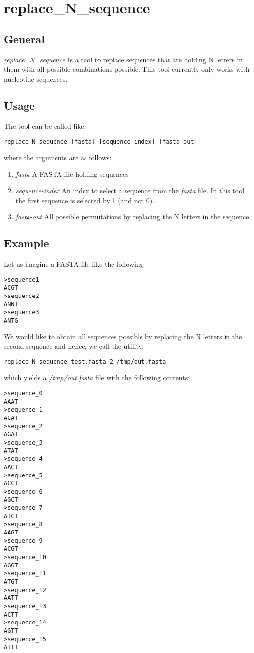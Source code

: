 \section{replace\_N\_sequence}


\subsection{General}

\emph{replace\_N\_sequence} Is a tool to replace sequences that are
holding N letters in them with all possible combinations
possible. This tool currently only works with nucleotide sequences.

\subsection{Usage}

The tool can be called like:
\begin{lstlisting}
replace_N_sequence [fasta] [sequence-index] [fasta-out]
\end{lstlisting}
where the arguments are as follows:
\begin{enumerate}
\item \emph{fasta} A FASTA file holding sequences
\item \emph{sequence-index} An index to select a sequence from the
  \emph{fasta} file. In this tool the first sequence is selected by
  1 (and not 0).
\item \emph{fasta-out} All possible permutations by replacing the N
  letters in the sequence.
\end{enumerate}

\subsection{Example}
Let us imagine a FASTA file like the following:
\begin{lstlisting}
>sequence1
ACGT
>sequence2
ANNT
>sequence3
ANTG
\end{lstlisting}
We would like to obtain all sequences possible by replacing the N letters
in the second sequence and hence, we call the utility:
\begin{lstlisting}
replace_N_sequence test.fasta 2 /tmp/out.fasta
\end{lstlisting}
which yields a \emph{/tmp/out.fasta} file with the following contents:
\begin{lstlisting}
>sequence_0
AAAT
>sequence_1
ACAT
>sequence_2
AGAT
>sequence_3
ATAT
>sequence_4
AACT
>sequence_5
ACCT
>sequence_6
AGCT
>sequence_7
ATCT
>sequence_8
AAGT
>sequence_9
ACGT
>sequence_10
AGGT
>sequence_11
ATGT
>sequence_12
AATT
>sequence_13
ACTT
>sequence_14
AGTT
>sequence_15
ATTT
\end{lstlisting}


